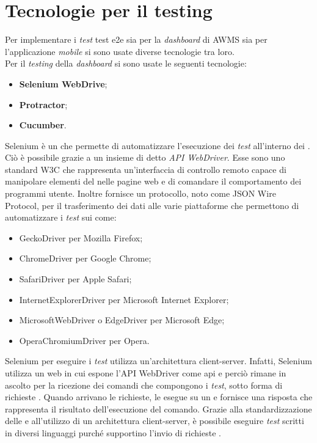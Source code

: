 \section{Tecnologie per il testing}
Per implementare i \emph{test} \gls{test e2e} sia per la \emph{dashboard} di \gls{AWMS} sia per l'applicazione \emph{mobile} si sono usate diverse tecnologie tra loro.\\
Per il \emph{testing} della \emph{dashboard} si sono usate le seguenti tecnologie:
\begin{itemize}
	\item \textbf{Selenium WebDrive};
	\item \textbf{Protractor};
	\item \textbf{Cucumber}.
\end{itemize}
Selenium è un  che permette di automatizzare l'esecuzione dei \emph{test} all'interno dei . Ciò è possibile grazie a un insieme di  detto \emph{API WebDriver}. Esse sono uno standard \gls{W3C} che rappresenta un'interfaccia di controllo remoto capace di manipolare elementi del  nelle pagine web e di comandare il comportamento dei programmi utente. Inoltre fornisce un protocollo, noto come JSON Wire Protocol, per il trasferimento dei dati alle varie piattaforme che permettono di automatizzare i \emph{test} sui  come:
\begin{itemize}
	\item GeckoDriver per Mozilla Firefox;
	\item ChromeDriver per Google Chrome;
	\item SafariDriver per Apple Safari;
	\item InternetExplorerDriver per Microsoft Internet Explorer;
	\item MicrosoftWebDriver o EdgeDriver per Microsoft Edge;
	\item OperaChromiumDriver per Opera.
\end{itemize}
Selenium per eseguire i \emph{test} utilizza un’architettura client-server. Infatti, Selenium utilizza un  web in cui espone l'API WebDriver come \gls{api}  e perciò rimane in ascolto per la ricezione dei comandi che compongono i \emph{test}, sotto forma di richieste . Quando arrivano le richieste, le esegue su un  e fornisce una risposta  che rappresenta il risultato dell'esecuzione del comando. Grazie alla standardizzazione delle  e all'utilizzo di un architettura client-server, è possibile eseguire \emph{test} scritti in diversi linguaggi purché supportino l'invio di richieste .\\

